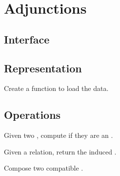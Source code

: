 \section{Adjunctions}

\subsection*{Interface}

\subsection*{Representation}



\begin{codeexercise}
    Create a function to load the data.

\end{codeexercise}

\subsection{Operations}
\begin{codeexercise}
    Given two , compute if they are an .

\end{codeexercise}

\begin{codeexercise}
    Given a relation, return the induced .
\end{codeexercise}

\begin{codeexercise}
    Compose two compatible .
\end{codeexercise}
